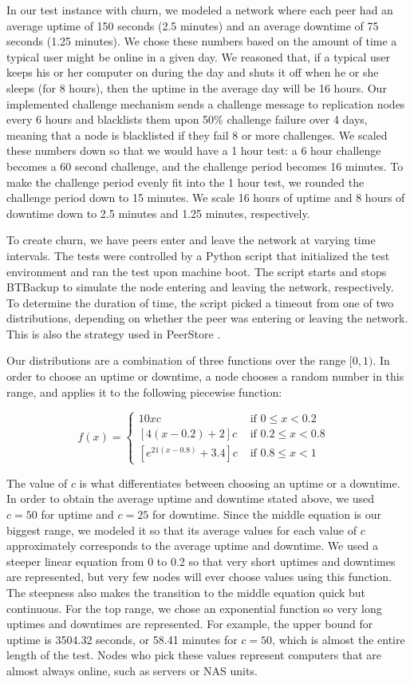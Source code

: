 \documentclass[12pt]{report}
\begin{document}
In our test instance with churn, we modeled a network where each peer had an average uptime of 150 seconds (2.5 minutes) and an average downtime of 75 seconds (1.25 minutes). We chose these numbers based on the amount of time a typical user might be online in a given day. We reasoned that, if a typical user keeps his or her computer on during the day and shuts it off when he or she sleeps (for 8 hours), then the uptime in the average day will be 16 hours. Our implemented challenge mechanism sends a challenge message to replication nodes every 6 hours and blacklists them upon 50\% challenge failure over 4 days, meaning that a node is blacklisted if they fail 8 or more challenges. We scaled these numbers down so that we would have a 1 hour test: a 6 hour challenge becomes a 60 second challenge, and the challenge period becomes 16 minutes. To make the challenge period evenly fit into the 1 hour test, we rounded the challenge period down to 15 minutes. We scale 16 hours of uptime and 8 hours of downtime down to 2.5 minutes and 1.25 minutes, respectively.

To create churn, we have peers enter and leave the network at varying time intervals. The tests were controlled by a Python script that initialized the test environment and ran the test upon machine boot. The script starts and stops BTBackup to simulate the node entering and leaving the network, respectively. To determine the duration of time, the script picked a timeout from one of two distributions, depending on whether the peer was entering or leaving the network.  This is also the strategy used in PeerStore \cite{PeerStore}.

Our distributions are a combination of three functions over the range $[0,1)$. In order to choose an uptime or downtime, a node chooses a random number in this range, and applies it to the following piecewise function:

$$
f(x)=
\begin{cases}
10xc & \mbox{ if $0 \leq x < 0.2$ } \\
[4(x-0.2)+2]c & \mbox{ if $0.2 \leq x < 0.8$ } \\
[e^{21(x-0.8)}+3.4]c & \mbox{ if $0.8 \leq x < 1$ }
\end{cases}
$$

The value of $c$ is what differentiates between choosing an uptime or a downtime. In order to obtain the average uptime and downtime stated above, we used $c=50$ for uptime and $c=25$ for downtime. Since the middle equation is our biggest range, we modeled it so that its average values for each value of $c$ approximately corresponds to the average uptime and downtime. We used a steeper linear equation from 0 to 0.2 so that very short uptimes and downtimes are represented, but very few nodes will ever choose values using this function. The steepness also makes the transition to the middle equation quick but continuous. For the top range, we chose an exponential function so very long uptimes and downtimes are represented. For example, the upper bound for uptime is 3504.32 seconds, or 58.41 minutes for $c=50$, which is almost the entire length of the test. Nodes who pick these values represent computers that are almost always online, such as servers or NAS units.
\end{document}
